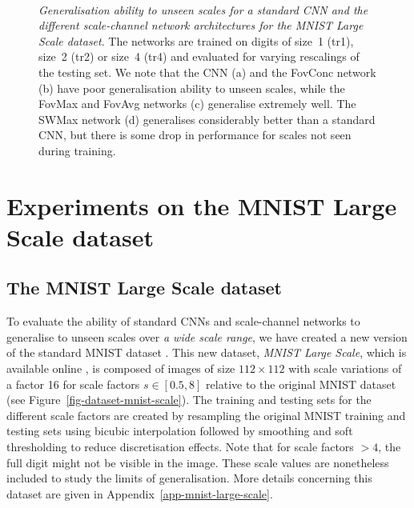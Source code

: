 \documentclass[twocolumn,runningheads]{svjour3}
\begin{document}
\begin{figure*}[h]
	\centering
 \\
\vspace*{-1em}
	\caption{{\em Generalisation ability to unseen scales for a
            standard CNN and the different scale-channel network
            architectures for the MNIST Large Scale dataset\/}. The networks are trained on digits of
          size~1 (tr1), size~2 (tr2) or size~4 (tr4) and evaluated
          for varying rescalings of the testing set. We note that the CNN
          (a) and the FovConc network (b) have poor generalisation
          ability to unseen scales, while the FovMax and FovAvg
          networks (c) generalise extremely well. The SWMax network
          (d) generalises considerably better than a standard CNN, but
          there is some drop in performance for scales not seen during
          training.}
	\label{fig-single-scale-generalisation}
\end{figure*}


\section{Experiments on the MNIST Large Scale dataset}
\label{sec-exp-MNISTLargeScale}

\subsection{The MNIST Large Scale dataset}
\label{sec-mnist-scale}

To evaluate the ability of standard CNNs and  scale-channel networks
to generalise to unseen scales over {\em a wide scale range\/}, we have
created a new version of the standard MNIST dataset
\cite{LecBotBenHaf98-ProcIEEE}. 
This new dataset, {\em MNIST Large Scale\/}, which is available online
\cite{JanLin20-MNISTLargeScale}, is composed of images of size 
$112 \times 112$  with scale variations of a factor 16 for 
scale factors $s \in [0.5, 8]$ relative to the original MNIST dataset  
(see Figure~\ref{fig-dataset-mnist-scale}). 
The training and testing sets for the different scale factors are created
by resampling the original MNIST training and testing sets using bicubic
interpolation followed by smoothing and soft thresholding to reduce
discretisation effects. Note that for scale factors $>4$, the full
digit might not be visible in the image. These scale values are
nonetheless included to study the limits of generalisation. More
details concerning this dataset are given in
Appendix~\ref{app-mnist-large-scale}.
\end{document}

